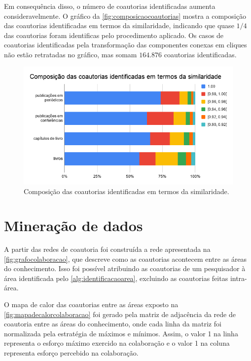Em consequência disso, o número de coautorias identificadas aumenta consideravelmente. O gráfico da \autoref{fig:composicaocoautorias} mostra a composição das coautorias identificadas em termos da similaridade, indicando que quase $1/4$ das coautorias foram identificas pelo procedimento aplicado. Os casos de coautorias identificadas pela transformação das componentes conexas em cliques não estão retratadas no gráfico, mas somam $164.876$ coautorias identificadas.

\begin{figure}[htpb]
  \centering
  \includegraphics[scale=.5]{figuras/metodo-composicao-coautorias}
  \caption{Composição das coautorias identificadas em termos da similaridade.}
  \label{fig:composicaocoautorias}
\end{figure}

\section{Mineração de dados}

A partir das redes de coautoria foi construída a rede apresentada na \autoref{fig:grafocolaboracao}, que descreve como as coautorias acontecem entre as áreas do conhecimento. Isso foi possível atribuindo as coautorias de um pesquisador à área identificada pelo \autoref{alg:identificacaoarea}, excluindo as coautorias feitas intra-área.

O mapa de calor das coautorias entre as áreas exposto na \autoref{fig:mapadecalorcolaboracao} foi gerado pela matriz de adjacência da rede de coautoria entre as áreas do conhecimento, onde cada linha da matriz foi normalizada pela estratégia de máximos e mínimos. Assim, o valor 1 na linha representa o esforço máximo exercido na colaboração e o valor 1 na coluna representa esforço percebido na colaboração.


